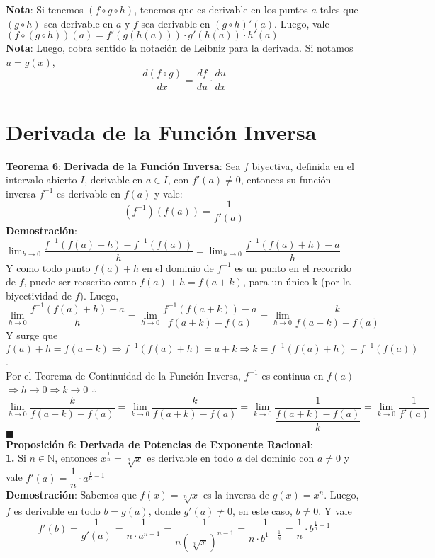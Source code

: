 \documentclass[11pt,a4paper]{article}
\newcommand*{\QEDA}{\null\nobreak\hfill\ensuremath{\blacksquare}}
\begin{document}
\textbf{Nota}: Si tenemos $(f \circ g \circ h)$, tenemos que es derivable en los puntos $a$ tales que $(g \circ h)$ sea derivable en $a$ y $f$ sea derivable en $(g \circ h)'(a)$. Luego, vale $(f \circ (g \circ h))(a) = f'(g(h(a))) \cdot g'(h(a)) \cdot h'(a)$\\

\textbf{Nota}: Luego, cobra sentido la notaci\'on de Leibniz para la derivada. Si notamos $u = g(x)$, $$\dfrac{d(f \circ g)}{dx} = \dfrac{df}{du} \cdot \dfrac{du}{dx}$$

\section{Derivada de la Funci\'on Inversa}
\textbf{Teorema 6}: \textbf{Derivada de la Funci\'on Inversa}: Sea $f$ biyectiva, definida en el intervalo abierto $I$, derivable en $a \in I$, con $f'(a)\not=0$, entonces su funci\'on inversa $f^{-1}$ es derivable en $f(a)$ y vale: $$(f^{-1})(f(a)) = \dfrac{1}{f'(a)}$$
\textbf{Demostraci\'on}: 
$\displaystyle{\lim_{h \to 0} \dfrac{f^{-1}(f(a)+h) - f^{-1}(f(a))}{h}}
= \displaystyle{\lim_{h \to 0} \dfrac{f^{-1}(f(a)+h) - a}{h}}$\\
Y como todo punto $f(a)+h$ en el dominio de $f^{-1}$ es un punto en el recorrido de $f$, puede ser reescrito como $f(a)+h = f(a+k)$, para un \'unico k (por la biyectividad de $f$). Luego, \\
$$\displaystyle{\lim_{h \to 0} \dfrac{f^{-1}(f(a)+h) - a}{h}} =
 \displaystyle{\lim_{h \to 0} \dfrac{f^{-1}(f(a+k)) - a}{f(a+k)-f(a)}} =
 \displaystyle{\lim_{h \to 0} \dfrac{k}{f(a+k)-f(a)}}$$
Y surge que $f(a)+h = f(a+k) \Rightarrow f^{-1}(f(a)+h)=a+k \Rightarrow k = f^{-1}(f(a)+h) - f^{-1}(f(a))$. \\
Por el Teorema de Continuidad de la Funci\'on Inversa, $f^{-1}$ es continua en $f(a)$ $\Rightarrow h \rightarrow 0 \Rightarrow k \rightarrow 0$ $\therefore$
$$\displaystyle{\lim_{h \to 0} \dfrac{k}{f(a+k)-f(a)}} = \displaystyle{\lim_{k \to 0} \dfrac{k}{f(a+k)-f(a)}} = \displaystyle{\lim_{k \to 0} \dfrac{1}{\dfrac{f(a+k)-f(a)}{k}}} = \displaystyle{\lim_{k \to 0} \dfrac{1}{f'(a)}}$$ \QEDA\\

\noindent \textbf{Proposici\'on 6}: \textbf{Derivada de Potencias de Exponente Racional}:\\
\textbf{1.} Si $n \in \mathbb{N}$, entonces $x^{\frac{1}{n}} = \sqrt[n]{x}$ es derivable en todo $a$ del dominio con $a\not=0$ y vale $f'(a) = \dfrac{1}{n} \cdot a^{\frac{1}{n}-1}$\\
\textbf{Demostraci\'on}: Sabemos que $f(x)=\sqrt[n]{x}$ es la inversa de $g(x)=x^n$. Luego, $f$ es derivable en todo $b = g(a)$, donde $g'(a)\not=0$, en este caso, $b\not=0$. Y vale $$f'(b)=\dfrac{1}{g'(a)} = \dfrac{1}{n\cdot a^{n-1}} = \dfrac{1}{n(\sqrt[n]{x})^{n-1}} = \dfrac{1}{n\cdot b^{1-\frac{1}{n}}} = \dfrac{1}{n}\cdot b^{\frac{1}{n}-1}$$
\end{document}
